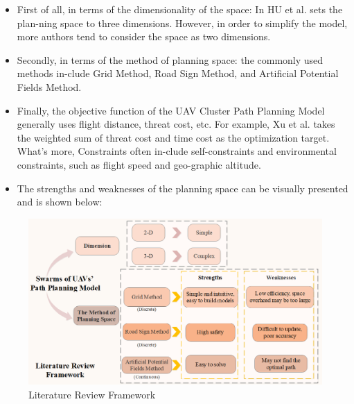\documentclass[12pt]{article}  %
\begin{document}
\begin{itemize}
\setlength{\parsep}{0ex} %
\setlength{\topsep}{2ex} %
\setlength{\itemsep}{1ex} %
\item First of all, in terms of the dimensionality of the space: In\cite{2} HU et al. sets the plan-ning space to three dimensions. However, in order to simplify the model, more authors tend to consider the space as two dimensions\cite{3}.
\item Secondly, in terms of the method of planning space: the commonly used methods in-clude Grid Method\cite{4}, Road Sign Method, and Artificial Potential Fields Method.
\item Finally, the objective function of the UAV Cluster Path Planning Model generally uses flight distance, threat cost, etc. For example, Xu et al.\cite{5} takes the weighted sum of threat cost and time cost as the optimization target. What's more, Constraints often in-clude self-constraints and environmental constraints, such as flight speed and geo-graphic altitude.
\item The strengths and weaknesses of the planning space can be visually presented and is shown below:
\end{itemize}

\begin{figure}[htbp]  %
\centering  %
\includegraphics[width=.85\textwidth]{Literature_Review.png} %
\caption{Literature Review Framework} %
\end{figure}
\end{document}

